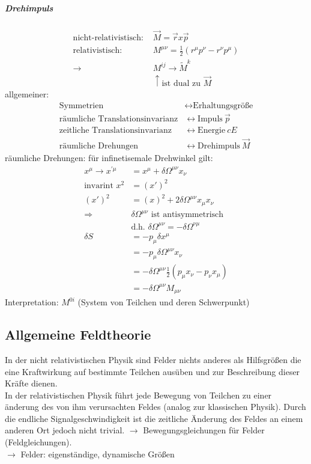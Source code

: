 \documentclass[a4paper]{article}
\begin{document}
\subparagraph{Drehimpuls}
\begin{align}
\text{nicht-relativistisch: } &\vec{M}=\vec{r}x\vec{p}\\
\text{relativistisch: } &M^{\mu\nu}=\frac{1}{2}(r^\mu p^\nu-r^\nu p^\mu)\\
\rightarrow &M^{ij}\rightarrow \tilde{M}^k \\
&\uparrow \text{ist dual zu } \vec{M}
\end{align}
allgemeiner:
\begin{align}
\text{Symmetrien} &\leftrightarrow \text{Erhaltungsgröße}\\
\text{räumliche Translationsinvarianz} &\leftrightarrow \text{Impuls}\ \vec{p}\\
\text{zeitliche Translationsinvarianz} &\leftrightarrow \text{Energie}\ cE\\
\text{räumliche Drehungen} &\leftrightarrow \text{Drehimpuls}\ \vec{M}
\end{align}
räumliche Drehungen: für infinetisemale Drehwinkel gilt:
\begin{align}
x^\mu \rightarrow x^{'\mu}&=x^\mu+\delta\Omega^{\mu\nu}x_\nu \\
\text{invarint } x^2&=(x')^{2}\\
(x')^2&=(x)^2+2\delta\Omega^{\mu\nu}x_\mu x_\nu\\
\Rightarrow &\delta\Omega^{\mu\nu} \text{ ist antisymmetrisch}\\
&\text{d.h. } \delta\Omega^{\mu\nu}=-\delta\Omega^{\nu\mu}\\
\delta S&=-p_\mu \delta x^\mu\\
&=-p_\mu \delta\Omega^{\mu\nu} x_\nu\\
&=-\delta\Omega^{\mu\nu} \frac{1}{2}(p_\mu x_\nu-p_\nu x_\mu)\\
&=-\delta\Omega^{\mu\nu}M_{\mu\nu}
\end{align}
Interpretation: $M^{0i}$ (System von Teilchen und deren Schwerpunkt)

\subsection{Allgemeine Feldtheorie}
In der nicht relativistischen Physik sind Felder nichts anderes als Hilfsgrößen
die eine Kraftwirkung auf bestimmte Teilchen ausüben und zur Beschreibung dieser
Kräfte dienen.\\ 
In der relativistischen Physik führt jede Bewegung von Teilchen zu einer
änderung des von ihm verursachten Feldes (analog zur klassischen Physik).
Durch die endliche Signalgeschwindigkeit ist die zeitliche Änderung des Feldes
an einem anderen Ort jedoch nicht trivial. $\rightarrow$ Bewegungsgleichungen
für Felder (Feldgleichungen).\\
$\rightarrow$ Felder: eigenständige, dynamische Größen
\end{document}
